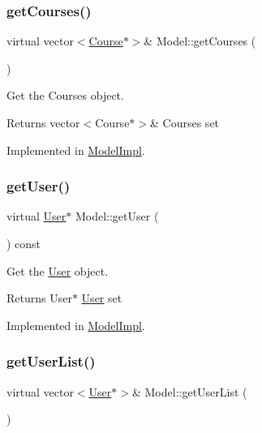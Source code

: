 \subsubsection{\texorpdfstring{get\+Courses()}{getCourses()}}
{\footnotesize\ttfamily virtual vector$<$\hyperlink{classCourse}{Course}$\ast$$>$\& Model\+::get\+Courses (\begin{DoxyParamCaption}{ }\end{DoxyParamCaption})\hspace{0.3cm}{\ttfamily [pure virtual]}}



Get the Courses object. 

\begin{DoxyReturn}{Returns}
vector$<$\+Course$\ast$$>$\& Courses set 
\end{DoxyReturn}


Implemented in \hyperlink{classModelImpl_afc84ed40271afee13778f4e9f9f90e2e}{Model\+Impl}.

\mbox{\label{classModel_a20cb9f90df3f8f235dc14fbc13b64167}} 
\subsubsection{\texorpdfstring{get\+User()}{getUser()}}
{\footnotesize\ttfamily virtual \hyperlink{classUser}{User}$\ast$ Model\+::get\+User (\begin{DoxyParamCaption}{ }\end{DoxyParamCaption}) const\hspace{0.3cm}{\ttfamily [pure virtual]}}



Get the \hyperlink{classUser}{User} object. 

\begin{DoxyReturn}{Returns}
User$\ast$ \hyperlink{classUser}{User} set 
\end{DoxyReturn}


Implemented in \hyperlink{classModelImpl_ac098ad97916ff988d518ded5056dabb0}{Model\+Impl}.

\mbox{\label{classModel_a3e27c021561cb19ce48d4a456e75d5ab}} 
\subsubsection{\texorpdfstring{get\+User\+List()}{getUserList()}}
{\footnotesize\ttfamily virtual vector$<$\hyperlink{classUser}{User}$\ast$$>$\& Model\+::get\+User\+List (\begin{DoxyParamCaption}{ }\end{DoxyParamCaption})\hspace{0.3cm}{\ttfamily [pure virtual]}}



